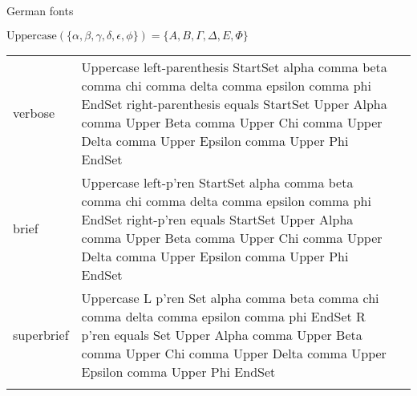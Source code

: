 
\R
German fonts


\R
\E $\mathrm{Uppercase}(\{\alpha,\beta,\gamma,\delta,\epsilon,\phi\}) = \{A,B,\Gamma,\Delta,E,\Phi\}$
\begin{longtable}[c]{@{}lll@{}}
\toprule\addlinespace
verbose & Uppercase left-parenthesis StartSet alpha comma beta comma chi
comma delta comma epsilon comma phi EndSet right-parenthesis equals
StartSet Upper Alpha comma Upper Beta comma Upper Chi comma Upper Delta
comma Upper Epsilon comma Upper Phi EndSet &

\\\addlinespace
brief & Uppercase left-p'ren StartSet alpha comma beta comma chi comma
delta comma epsilon comma phi EndSet right-p'ren equals StartSet Upper
Alpha comma Upper Beta comma Upper Chi comma Upper Delta comma Upper
Epsilon comma Upper Phi EndSet &

\\\addlinespace
superbrief & Uppercase L p'ren Set alpha comma beta comma chi comma
delta comma epsilon comma phi EndSet R p'ren equals Set Upper Alpha
comma Upper Beta comma Upper Chi comma Upper Delta comma Upper Epsilon
comma Upper Phi EndSet &

\\\addlinespace
\bottomrule
\end{longtable}


